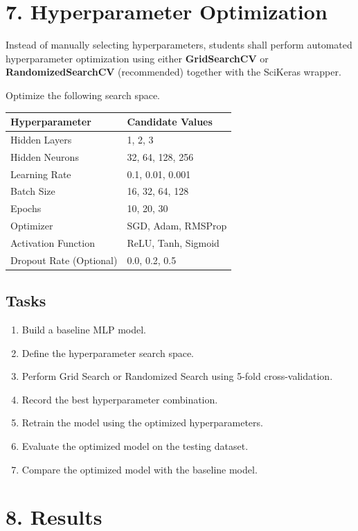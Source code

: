 \documentclass[11pt]{article}
\begin{document}
\section*{7. Hyperparameter Optimization}

Instead of manually selecting hyperparameters, students shall perform automated hyperparameter optimization using either \textbf{GridSearchCV} or \textbf{RandomizedSearchCV} (recommended) together with the SciKeras wrapper.

Optimize the following search space.

\begin{center}
\begin{tabular}{|p{5cm}|p{7cm}|}
\hline
Hyperparameter & Candidate Values\\
\hline
Hidden Layers & 1, 2, 3\\
Hidden Neurons & 32, 64, 128, 256\\
Learning Rate & 0.1, 0.01, 0.001\\
Batch Size & 16, 32, 64, 128\\
Epochs & 10, 20, 30\\
Optimizer & SGD, Adam, RMSProp\\
Activation Function & ReLU, Tanh, Sigmoid\\
Dropout Rate (Optional) & 0.0, 0.2, 0.5\\
\hline
\end{tabular}
\end{center}

\subsection*{Tasks}

\begin{enumerate}
\item Build a baseline MLP model.
\item Define the hyperparameter search space.
\item Perform Grid Search or Randomized Search using 5-fold cross-validation.
\item Record the best hyperparameter combination.
\item Retrain the model using the optimized hyperparameters.
\item Evaluate the optimized model on the testing dataset.
\item Compare the optimized model with the baseline model.
\end{enumerate}

\section*{8. Results}
\end{document}
